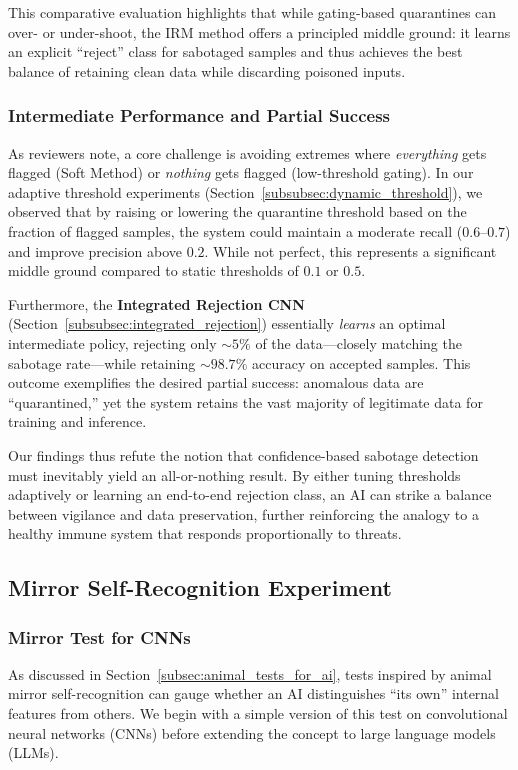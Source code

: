 \documentclass[12pt]{article}
\begin{document}
\medskip
This comparative evaluation highlights that while gating-based quarantines
can over- or under-shoot, the IRM method offers a principled middle ground:
it learns an explicit “reject” class for sabotaged samples and thus achieves
the best balance of retaining clean data while discarding poisoned inputs.

\subsubsection{Intermediate Performance and Partial Success}
\label{subsubsec:intermediate_performance}

As reviewers note, a core challenge is avoiding extremes where
\emph{everything} gets flagged (Soft Method) or \emph{nothing}
gets flagged (low-threshold gating). In our adaptive threshold
experiments (Section~\ref{subsubsec:dynamic_threshold}), we
observed that by raising or lowering the quarantine threshold
based on the fraction of flagged samples, the system could
maintain a moderate recall (\(0.6\)--\(0.7\)) and improve precision
above \(0.2\). While not perfect, this represents a significant
middle ground compared to static thresholds of \(0.1\) or \(0.5\).

Furthermore, the \textbf{Integrated Rejection CNN} (Section~\ref{subsubsec:integrated_rejection})
essentially \emph{learns} an optimal intermediate policy, rejecting
only \(\sim5\%\) of the data---closely matching the sabotage rate---while retaining
\(\sim98.7\%\) accuracy on accepted samples. This outcome exemplifies the
desired partial success: anomalous data are “quarantined,” yet the system
retains the vast majority of legitimate data for training and inference.

Our findings thus refute the notion that confidence-based
sabotage detection must inevitably yield an all-or-nothing result.
By either tuning thresholds adaptively or learning an end-to-end
rejection class, an AI can strike a balance between vigilance and
data preservation, further reinforcing the analogy to a healthy
immune system that responds proportionally to threats.



\subsection{Mirror Self-Recognition Experiment}
\label{sec:mirror_results}

\subsubsection{Mirror Test for CNNs}
As discussed in Section~\ref{subsec:animal_tests_for_ai}, tests inspired by animal mirror 
self-recognition can gauge whether an AI distinguishes “its own” internal features from others. 
We begin with a simple version of this test on convolutional neural networks (CNNs) before extending 
the concept to large language models (LLMs).
\end{document}
